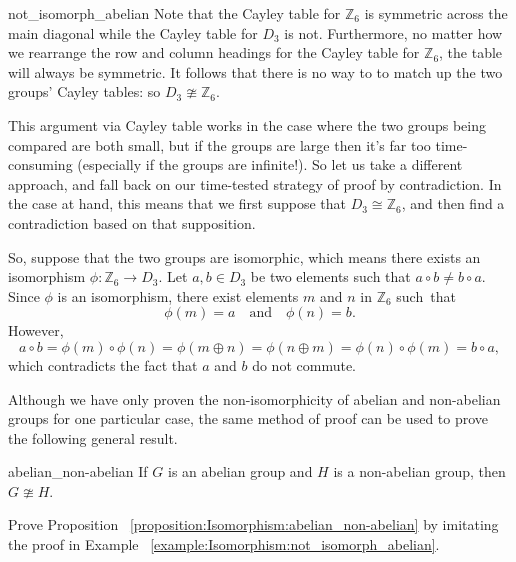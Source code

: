 \begin{example}{not_isomorph_abelian}
Note that the Cayley table for ${\mathbb Z}_6$ is symmetric across the main diagonal while the Cayley table for $D_3$ is not.  Furthermore, no matter how we rearrange the row and column headings for the Cayley table for ${\mathbb Z}_6$, the  table will always be symmetric. It follows that there is no way to to match up the two groups' Cayley tables: so $D_3 \ncong {\mathbb Z}_6$.

This  argument via Cayley table works in the case where the two groups being compared are both small, but if the groups are large then it's far too time-consuming (especially if the groups are infinite!). So let us take a different approach, and fall back on our time-tested strategy of proof by contradiction. In the case at hand, this means that we first suppose that $D_3 \cong {\mathbb Z}_6$, and  then find a contradiction based on that supposition. 

So, suppose that the two groups are isomorphic, which means there exists an isomorphism $\phi : {\mathbb Z}_6 \rightarrow  D_3$.  Let $a , b \in D_3$ be two elements such that $a\circ b \neq b \circ a$.  Since $\phi$ is an isomorphism, there exist elements $m$ and $n$ in ${\mathbb Z}_6$ such~that 
\[
\phi( m )  = a \quad \text{and} \quad
\phi( n )  = b.
\]
However,
\[
a\circ b = \phi(m ) \circ  \phi(n) = \phi(m \oplus  n) = \phi(n \oplus m) = \phi(n ) \circ \phi(m) = b \circ a,
\]
which contradicts the fact that $a$ and $b$ do not commute.
\end{example}

Although we have only proven the non-isomorphicity of abelian and non-abelian groups for one particular case, the same  method of proof can be used to prove the following general result.

\begin{prop}{abelian_non-abelian}
If $G$ is an abelian group and $H$ is a non-abelian group, then $G \ncong H$.
\end{prop}

\begin{exercise}{}
Prove Proposition ~\ref{proposition:Isomorphism:abelian_non-abelian} by imitating the proof in Example ~\ref{example:Isomorphism:not_isomorph_abelian}.
\end{exercise}

